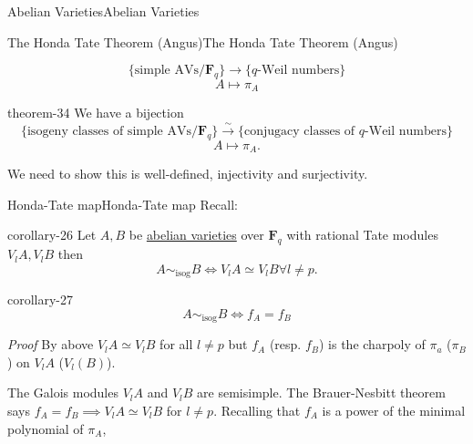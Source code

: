 \documentclass[10pt,]{book}
\makeatletter
\renewcommand*{\proofname}{Proof}
\renewenvironment{proof}[1][\proofname]{\par
  \pushQED{\qed}%
  \normalfont \topsep6\p@\@plus6\p@\relax
  \trivlist
  \item\relax
    {\itshape
    #1\@addpunct{.}}\hspace\labelsep\ignorespaces
}{%
  \popQED\endtrivlist\@endpefalse
}
\numberwithin{equation}{section}
\newcommand{\FF}{\mathbf{F}}
\makeatother
\begin{document}
\begin{chapterptx}{Abelian Varieties}{}{Abelian Varieties}{}{}
\begin{sectionptx}{The Honda Tate Theorem (Angus)}{}{The Honda Tate Theorem (Angus)}{}{}
\begin{introduction}{}
\begin{equation*}
\{\text{simple AVs}/\FF_q\}\to \{q\text{-Weil numbers}\}
\end{equation*}
%
\begin{equation*}
A \mapsto \pi_A
\end{equation*}
%
\begin{theorem}{}{}{theorem-34}%
\hypertarget{p-407}{}%
We have a bijection%
\begin{equation*}
\{\text{isogeny classes of simple AVs}/\FF_q\}\xrightarrow{\sim} \{\text{conjugacy classes of }q\text{-Weil numbers}\}
\end{equation*}
%
\begin{equation*}
A \mapsto \pi_A\text{.}
\end{equation*}
%
\end{theorem}
\hypertarget{p-408}{}%
We need to show this is well-defined, injectivity and surjectivity.%
\end{introduction}%
%
%
\typeout{************************************************}
\typeout{************************************************}
%
\begin{subsectionptx}{Honda-Tate map}{}{Honda-Tate map}{}{}\label{subsection-36}
\hypertarget{p-409}{}%
Recall:%
\begin{corollary}{}{}{corollary-26}%
\hypertarget{p-410}{}%
Let \(A,B\) be \hyperref[def-buntes-abvar]{abelian varieties} over \(\FF_q\) with rational Tate modules \(V_l A, V_lB\) then%
\begin{equation*}
A\sim_{\text{isog}} B \iff V_l A \simeq V_l B \forall l \ne p\text{.}
\end{equation*}
%
\end{corollary}
\begin{corollary}{}{}{corollary-27}%
\hypertarget{p-411}{}%
%
\begin{equation*}
A\sim_{\text{isog}} B \iff f_A = f_B
\end{equation*}
%
\end{corollary}
\begin{proof}\hypertarget{proof-70}{}
\hypertarget{p-412}{}%
By above \(V_l A \simeq V_lB\) for all \(l \ne p\) but \(f_A\) (resp. \(f_B\)) is the charpoly of \(\pi_a\) (\(\pi_B\)) on \(V_l A\) (\(V_l(B)\)).%
\par
\hypertarget{p-413}{}%
The Galois modules \(V_lA\) and \(V_l B\) are semisimple. The Brauer-Nesbitt theorem says \(f_A = f_B \implies V_lA \simeq V_lB \) for \(l\ne p\).%
\end{proof}
\hypertarget{p-414}{}%
Recalling that \(f_A\) is a power of the minimal polynomial of \(\pi_A\),%

\end{subsectionptx}
\end{sectionptx}
\end{chapterptx}
\end{document}
